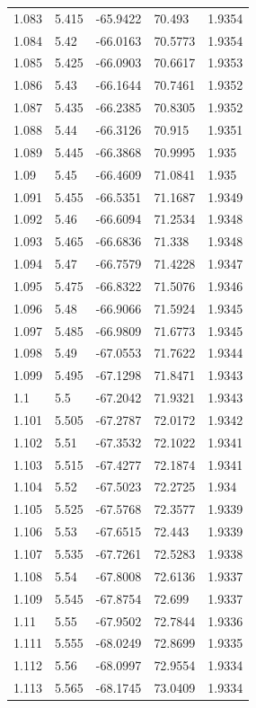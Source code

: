 \begin{tabular}{lllll}
1.083 & 5.415 & -65.9422 & 70.493 & 1.9354 \\
1.084 & 5.42 & -66.0163 & 70.5773 & 1.9354 \\
1.085 & 5.425 & -66.0903 & 70.6617 & 1.9353 \\
1.086 & 5.43 & -66.1644 & 70.7461 & 1.9352 \\
1.087 & 5.435 & -66.2385 & 70.8305 & 1.9352 \\
1.088 & 5.44 & -66.3126 & 70.915 & 1.9351 \\
1.089 & 5.445 & -66.3868 & 70.9995 & 1.935 \\
1.09 & 5.45 & -66.4609 & 71.0841 & 1.935 \\
1.091 & 5.455 & -66.5351 & 71.1687 & 1.9349 \\
1.092 & 5.46 & -66.6094 & 71.2534 & 1.9348 \\
1.093 & 5.465 & -66.6836 & 71.338 & 1.9348 \\
1.094 & 5.47 & -66.7579 & 71.4228 & 1.9347 \\
1.095 & 5.475 & -66.8322 & 71.5076 & 1.9346 \\
1.096 & 5.48 & -66.9066 & 71.5924 & 1.9345 \\
1.097 & 5.485 & -66.9809 & 71.6773 & 1.9345 \\
1.098 & 5.49 & -67.0553 & 71.7622 & 1.9344 \\
1.099 & 5.495 & -67.1298 & 71.8471 & 1.9343 \\
1.1 & 5.5 & -67.2042 & 71.9321 & 1.9343 \\
1.101 & 5.505 & -67.2787 & 72.0172 & 1.9342 \\
1.102 & 5.51 & -67.3532 & 72.1022 & 1.9341 \\
1.103 & 5.515 & -67.4277 & 72.1874 & 1.9341 \\
1.104 & 5.52 & -67.5023 & 72.2725 & 1.934 \\
1.105 & 5.525 & -67.5768 & 72.3577 & 1.9339 \\
1.106 & 5.53 & -67.6515 & 72.443 & 1.9339 \\
1.107 & 5.535 & -67.7261 & 72.5283 & 1.9338 \\
1.108 & 5.54 & -67.8008 & 72.6136 & 1.9337 \\
1.109 & 5.545 & -67.8754 & 72.699 & 1.9337 \\
1.11 & 5.55 & -67.9502 & 72.7844 & 1.9336 \\
1.111 & 5.555 & -68.0249 & 72.8699 & 1.9335 \\
1.112 & 5.56 & -68.0997 & 72.9554 & 1.9334 \\
1.113 & 5.565 & -68.1745 & 73.0409 & 1.9334 \\

\end{tabular}
